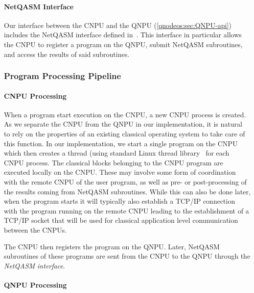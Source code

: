 \paragraph{NetQASM Interface}

Our interface between the \ac{CNPU} and the \ac{QNPU} (\cref{qnodeos:sec:QNPU-api}) includes the \ac{NetQASM} interface defined in~\cite[Appendix A]{dahlberg_2022_netqasm}.
This interface in particular allows the \ac{CNPU} to register a program on the \ac{QNPU}, submit \ac{NetQASM} subroutines, and access the results of said subroutines.

\subsubsection{Program Processing Pipeline}

\paragraph{CNPU Processing}

When a program start execution on the \ac{CNPU}, a new \ac{CNPU} process is created. As we separate the \ac{CNPU} from the \ac{QNPU} in our implementation, it is natural to rely on the properties of an existing classical operating system to take care of this function. In our implementation, we start a single program on the \ac{CNPU} which then creates a thread (using standard Linux thread library~\cite{linux_threads} for each \ac{CNPU} process. The classical blocks belonging to the \ac{CNPU} program are executed locally on the \ac{CNPU}. These may involve some form of coordination with the remote \ac{CNPU} of the user program, as well as pre- or post-processing of the results coming from \ac{NetQASM} subroutines. While this can also be done later, when the program starts it will typically also establish a TCP/IP connection with the program running on the remote \ac{CNPU} leading to the establishment of a TCP/IP socket that will be used for classical application level communication between the \acp{CNPU}.

The \ac{CNPU} then registers the program on the \ac{QNPU}. Later, \ac{NetQASM} subroutines of these programs are sent from the \ac{CNPU} to the \ac{QNPU} through the \emph{\ac{NetQASM} interface}. 

\paragraph{QNPU Processing}

